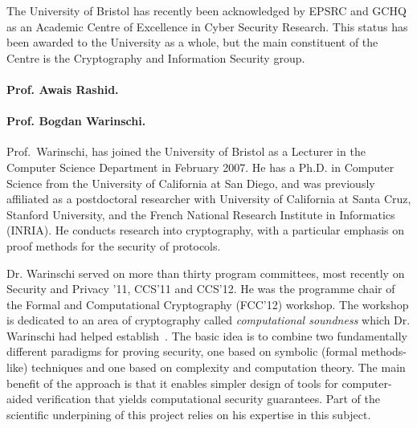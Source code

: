 \documentclass[10pt]{article}
\begin{document}
The University of Bristol has recently been acknowledged by 
EPSRC and GCHQ as an Academic Centre of Excellence in Cyber Security
Research. This status has been awarded to the University as a whole,
but the main constituent of the Centre is the Cryptography and Information
Security group.
\fi



\paragraph{Prof. Awais Rashid.}

\vspace{.5cm}


\paragraph{Prof. Bogdan Warinschi.}
Prof.~Warinschi, has joined the University of 
Bristol as a Lecturer in the Computer Science Department in February 2007. 
He has a Ph.D. in Computer Science from the University of California
at San Diego, and was previously affiliated as a postdoctoral researcher with
University of California at Santa Cruz, Stanford University, and the
French National Research Institute in Informatics (INRIA).
He conducts research into cryptography, with a particular emphasis on
proof methods for the security of protocols.


\iffalse
He was a co-investigator on the EP/H043454/1 EPSRC grant on "Privacy and Attestation Technologies" and on the ERC Advanced Grant ERC-2010-AdG-267188-CRIPTO on "Cryptography Research Involving Practical and Theoretical Outlooks". 
He is a co-PI on the FP 7 project ``PRACTICE" (grant agreement 609611).
\fi
Dr. Warinschi served on more than thirty program committees, most recently on Security and Privacy '11, CCS'11 and CCS'12. 
He was the programme chair of the Formal and Computational Cryptography (FCC'12) workshop. 
The workshop is dedicated to an area of cryptography called {\em computational   soundness} which Dr. Warinschi had helped establish~\cite{micciancio04completeness,micciancio04soundness,cortier05computationally,abadi05security,abadi05passwordbased,abadi06guessing,datta06computationally,cortier06computationally}.
The basic idea is to combine two fundamentally different paradigms for proving security, one based on symbolic (formal methods-like) techniques and one based on complexity and computation theory. The main benefit of the approach is that it enables simpler design of tools for computer-aided verification that yields computational security guarantees.
Part of the scientific underpining of this project relies on his expertise in this subject. 
\end{document}
